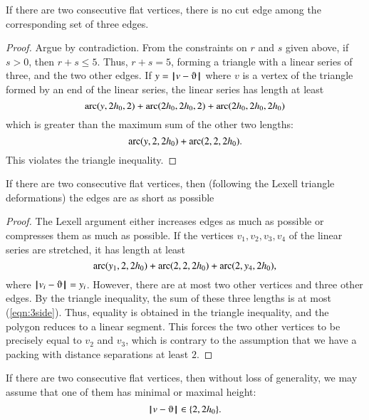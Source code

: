 \begin{lemma}
If there are two consecutive flat vertices, there is no cut edge among the corresponding set of three edges.
\end{lemma}

\begin{proof}  Argue by contradiction.  From the constraints on $r$ and $s$ given above, if $s>0$, then $r+s\le 5$.  Thus, $r+s=5$, forming a triangle with a linear series of three, and the two other edges.  If $y=\norm{v}{\orgn}$ where $v$ is a vertex of the triangle formed by an end of the linear series, the linear series has length at least
$$
\operatorname{arc}(y,2{h_0},2)+\operatorname{arc}(2{h_0},2{h_0},2) +\operatorname{arc}(2{h_0},2{h_0},2{h_0})
$$
which is greater than the maximum sum of the other two lengths:
$$
\operatorname{arc}(y,2,2{h_0})+\operatorname{arc}(2,2,2{h_0}).
$$
This violates the triangle inequality.
\end{proof}

\begin{lemma}  If there are two consecutive flat vertices, then (following the Lexell triangle deformations) the edges are as short as possible
\end{lemma}

\begin{proof} The Lexell argument either increases edges as much as possible or compresses them as much as possible.  If the vertices $v_1,v_2,v_3,v_4$ of the linear series are stretched, it has length at least
\begin{equation}\label{eqn:3side}
\operatorname{arc}(y_1,2,2{h_0})+\operatorname{arc}(2,2,2{h_0})+\operatorname{arc}(2,y_4,2{h_0}),
\end{equation}
where $\norm{v_i}{\orgn}=y_i$.
However, there are at most two other vertices and three other edges.  By the triangle inequality, the sum of these three lengths is at most (\ref{eqn:3side}).
Thus, equality is obtained in the triangle inequality, and the polygon reduces to a linear segment.  This forces the two other vertices to be precisely equal to $v_2$ and $v_3$, which is contrary to the assumption that we have a packing with distance separations at least $2$.
\end{proof}

\begin{lemma} If there are two consecutive flat vertices, then without loss of generality, we may assume that one of them has minimal or maximal height:
$$\norm{v}{\orgn}\in \{2,2\hm\}.$$
\end{lemma}

